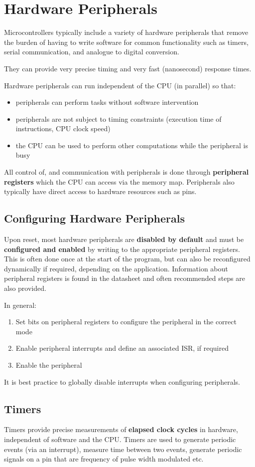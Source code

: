 \documentclass[a4paper]{report}
\begin{document}
\chapter{Hardware Peripherals}
Microcontrollers typically include a variety of hardware peripherals
that remove the burden of having to write software
for common functionality such as
timers, serial communication,
and analogue to digital conversion.

They can provide very precise timing and very fast (nanosecond) response times.

Hardware peripherals can run independent of the CPU (in parallel)
so that:
\begin{itemize}
    \item peripherals can perform tasks without software intervention
    \item peripherals are not subject to timing constraints (execution time of instructions, CPU clock speed)
    \item the CPU can be used to perform other computations while the peripheral is busy
\end{itemize}
All control of, and communication with peripherals is done through \textbf{peripheral registers}
which the CPU can access via the memory map. Peripherals also typically have direct access
to hardware resources such as pins.
\section{Configuring Hardware Peripherals}
Upon reset, most hardware peripherals are \textbf{disabled by default}
and must be \textbf{configured and enabled} by writing to the appropriate peripheral registers.
This is often done once at the start of the program, but can also be reconfigured dynamically
if required, depending on the application. Information about peripheral registers is found in the
datasheet and often recommended steps are also provided.

In general:
\begin{enumerate}
    \item Set bits on peripheral registers to configure the peripheral in the correct mode
    \item Enable peripheral interrupts and define an associated ISR, if required
    \item Enable the peripheral
\end{enumerate}
It is best practice to globally disable interrupts when configuring peripherals.
\section{Timers}
Timers provide precise measurements of \textbf{elapsed clock cycles} in
hardware, independent of software and the CPU\@.
Timers are used to generate periodic events (via an interrupt),
measure time between two events, generate periodic signals on a pin
that are frequency of pulse width modulated etc.
\end{document}
